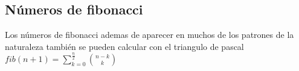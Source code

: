 \subsection{Números de fibonacci}
Los números de fibonacci  ademas de aparecer en muchos de los patrones de la naturaleza también se pueden calcular con el triangulo de pascal
\\
$fib(n+1)=\sum_{k=0}^{\frac{n}{2}}\binom{n-k}{k}$
